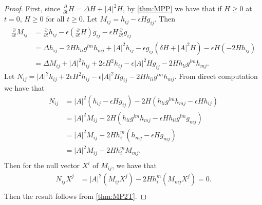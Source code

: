 \begin{proof}
	First, since $\frac{\partial }{\partial t} H=\Delta H+ \left| A \right| ^2 H$, by \autoref{thm:MPP} we have that if $H \geq 0$ at $t=0$, $H \geq 0$ for all $t \geq 0$.
	Let $M_{ij }^{} = h_{ij }^{} - \epsilon H g_{ij }^{} .$ Then
	\begin{equation*}
	\begin{split}
		\frac{\partial }{\partial t} M_{ij }^{}  
	&= \frac{\partial }{\partial t} h_{ij }^{} -\epsilon (\frac{\partial }{\partial t} H) g_{ij }^{} - \epsilon H \frac{\partial }{\partial t} g_{ij }^{}  \\
	&= \Delta h_{ij}^{} - 2 H h_{li }^{} g_{}^{lm } h_{mj}^{} + \left| A \right| ^2 h_{ij}^{}-\epsilon g_{ij }^{} (\delta H+ \left| A \right| ^2 H)-\epsilon H(-2H h_{ij }^{} )\\
	&= \Delta M_{ij }^{} + \left| A \right| ^{2}h_{ij }^{} + 2 \epsilon H^2 h_{ij }^{} - \epsilon \left| A \right| ^2 H g_{ij }^{} - 2 H h_{li }^{} g_{}^{lm } h_{mj}^{}.
	\end{split}
	\end{equation*}
	Let $N_{ij }^{} = \left| A \right| ^{2}h_{ij }^{} + 2 \epsilon H^2 h_{ij }^{} - \epsilon \left| A \right| ^2 H g_{ij }^{} - 2 H h_{li }^{} g_{}^{lm } h_{mj}^{}$. From direct computation we have that 
	\begin{equation*}
	\begin{split}
		N_{ij }^{} 
		&= \left| A \right| ^2(h_{ij }^{} -\epsilon H g_{ij }^{} )-2H(h_{li }^{} g_{}^{lm } h_{mj}^{}-\epsilon H h_{ij }^{} )\\
		&= \left|A \right| ^2 M_{ij }^{} -2H(h_{li }^{} g_{}^{lm } h_{mj}^{}-\epsilon H h_{li }^{} g_{}^{lm} g_{mj }^{} )\\
		&= \left|A \right| ^2 M_{ij }^{} -2H h_{i}^{m} (h_{mj }^{}-\epsilon H  g_{mj }^{} )\\
		&= \left|A \right| ^2 M_{ij }^{} -2H h_{i}^{m} M_{ mj}^{}. \\
	\end{split}
	\end{equation*}  
	Then for the null vector $X^i$ of $M_{ij }^{} $, we have that
	\begin{equation*}
	\begin{split}
		N_{ij }^{} X^j 
	&= \left|A \right| ^2 (M_{ij }^{}X^j) -2H h_{i}^{m} (M_{ mj}^{} X^j)=0.\\
	\end{split}
	\end{equation*}
	Then the result follows from \autoref{thm:MP2T}.
\end{proof}

